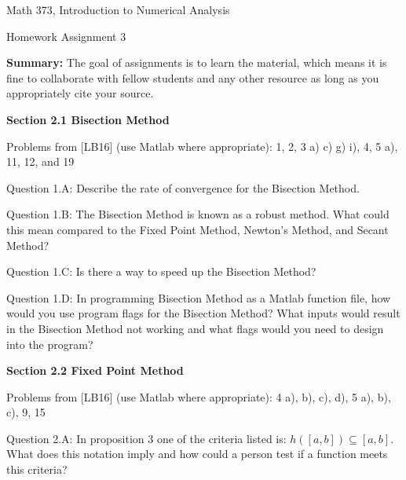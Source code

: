 \documentclass{article}
\renewcommand{\cite}[1]{[#1]}
\def\ds{\displaystyle}
\begin{document}

\large

{\Large Math 373, Introduction to Numerical Analysis}


{\Large Homework Assignment 3} 

{\bf Summary:} {\color{red} The goal of assignments is to learn the material, which means it is fine to collaborate with fellow students and any other resource as long as you appropriately cite your source.} 
\par \bigskip \par



{\bf Section 2.1 Bisection Method} \par \medskip \noindent
Problems from \cite{LB16} (use Matlab where appropriate): 1, 2, 3 a) c) g) i), 4, 5 a), 11, 12, and 19   
\par \medskip \noindent
%
Question 1.A: Describe the rate of convergence for the Bisection Method.   
\medskip \par \noindent
%
Question 1.B: The Bisection Method is known as a robust method. What could this mean compared to the Fixed Point Method, Newton's Method, and Secant Method?
\medskip \par \noindent
%
Question 1.C: Is there a way to speed up the Bisection Method?

\medskip \par \noindent
%
Question 1.D: In programming Bisection Method as a Matlab function file, how would you use program flags for the Bisection Method? What inputs would result in the Bisection Method not working and what flags would you need to design into the program?
\medskip \par \noindent
%
\par \bigskip \par
{\bf Section 2.2 Fixed Point Method} \\
\medskip \par \noindent
Problems from \cite{LB16} (use Matlab where appropriate): 4 a), b), c), d), 5 a), b), c), 9, 15
\par \medskip \noindent
%
Question 2.A: In proposition 3 one of the criteria listed is: $\ds h([a,b]) \subseteq [a,b]$. What does this notation imply and how could a person test if a function meets this criteria?
\end{document}
